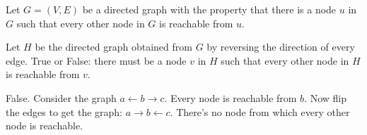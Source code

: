 \begin{prob}

    Let $G = (V, E)$ be a directed graph with the property that there is a node $u$ in $G$
    such that every other node in $G$ is reachable from $u$.

    Let $H $ be the directed graph obtained from $G$ by reversing the direction
    of every edge. True or False: there must be a node $v$ in $H$ such that
    every other node in $H$ is reachable from $v$.

    \tF{}


    \begin{soln}
        False. Consider the graph $a \leftarrow b \rightarrow c$. Every node is reachable from $b$.
        Now flip the edges to get the graph: $a \rightarrow b \leftarrow c$. There's no
        node from which every other node is reachable.
    \end{soln}

\end{prob}
